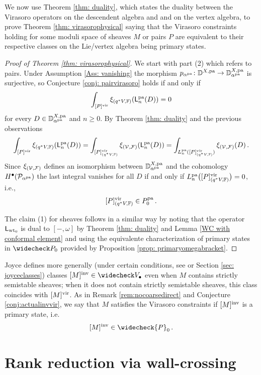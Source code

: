 \documentclass[a4paper, 12pt]{amsart}
\begin{document}
We now use Theorem \ref{thm: duality}, which states the duality between the Virasoro operators on the descendent algebra and and on the vertex algebra, to prove Theorem \ref{thm: virasorophysical} saying that the Virasoro constraints holding for some moduli space of sheaves $M$ or pairs $P$ are equivalent to their respective classes on the Lie/vertex algebra being primary states.
\begin{proof}[Proof of Theorem \ref{thm: virasorophysical}]
We start with part (2) which refers to pairs. Under Assumption \ref{Ass: vanishing} the morphism 
$p_{\alpha^{\mathop{\rm pa}\nolimits}}\colon {\mathbb{D}}^{X, \mathop{\rm pa}\nolimits}\to {\mathbb{D}}^{X, \mathop{\rm pa}\nolimits}_{\alpha^{\mathop{\rm pa}\nolimits}}$ is surjective, so Conjecture \ref{conj: pairvirasoro} holds if and only if
\[\int_{[P]^{\mathrm{vir}}}\xi_{(q^\ast V, {\mathbb{F}})}({\mathsf{L}}_n^{\mathop{\rm pa}\nolimits}(D))=0\]
for every $D\in {\mathbb{D}}^{X, \mathop{\rm pa}\nolimits}_{\alpha^{\mathop{\rm pa}\nolimits}}$ and $n\geq 0$. By Theorem \ref{thm: duality} and the previous observations
\[\int_{[P]^{\mathrm{vir}}}\xi_{(q^\ast V, {\mathbb{F}})}({\mathsf{L}}_n^{\mathop{\rm pa}\nolimits}(D))=\int_{[P]^{\mathrm{vir}}_{(q^\ast V, {\mathbb{F}})}}\xi_{({\mathcal V}, {\mathcal F})}({\mathsf{L}}_n^{\mathop{\rm pa}\nolimits}(D))=\int_{L_n^{\mathop{\rm pa}\nolimits}([P]^{\mathrm{vir}}_{(q^\ast V, {\mathbb{F}})})}\xi_{({\mathcal V}, {\mathcal F})}(D)\,.\]
Since $\xi_{({\mathcal V}, {\mathcal F})}$ defines an isomorphism between ${\mathbb{D}}^{X, \mathop{\rm pa}\nolimits}_{\alpha^{\mathop{\rm pa}\nolimits}}$ and the cohomology $H^\bullet({\mathcal P}_{\alpha^{\mathop{\rm pa}\nolimits}})$ the last integral vanishes for all $D$ if and only if $L_n^{\mathop{\rm pa}\nolimits}\big([P]^{\mathrm{vir}}_{(q^\ast V, {\mathbb{F}})}\big)=0$, i.e.,
\[[P]^{\mathrm{vir}}_{(q^\ast V, {\mathbb{F}})}\in P_0^{\mathop{\rm pa}\nolimits}\,.\]

The claim (1) for sheaves follows in a similar way by noting that the operator ${\mathsf{L}}_{\mathrm{wt}_0}$ is dual to $[-, \omega]$ by Theorem \ref{thm: duality} and Lemma \ref{WC with conformal element} and using the equivalente characterization of primary states in $\widecheck P_0$ provided by Proposition \ref{prop: primaryomegabracket}.\qedhere
\end{proof}

Joyce defines more generally (under certain conditions, see \cite[Theorem 5.7]{Jo21} or Section \ref{sec: joyceclasses}) classes $[M]^\inva\in \widecheck V_\bullet$ even when $M$ contains strictly semistable sheaves; when it does not contain strictly semistable sheaves, this class coincides with $[M]^{\mathrm{vir}}$. As in Remark \ref{rem:nocoarsedirect} and Conjecture \ref{conj:actualinvvir}, we say that $M$ satisfies the Virasoro constraints if $[M]^{\mathrm{inv}}$ is a primary state, i.e.
$$
  [M]^{\inva}\in \widecheck{P}_0\,.
$$



\section{Rank reduction via wall-crossing}
\label{sec: rankreduction}
\end{document}
